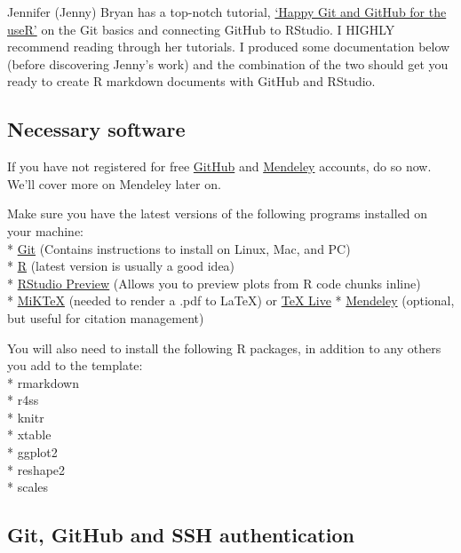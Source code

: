 \documentclass[12pt,]{article}
\begin{document}
Jennifer (Jenny) Bryan has a top-notch tutorial,
\href{http://happygitwithr.com/}{`Happy Git and GitHub for the useR'} on
the Git basics and connecting GitHub to RStudio. I HIGHLY recommend
reading through her tutorials. I produced some documentation below
(before discovering Jenny's work) and the combination of the two should
get you ready to create R markdown documents with GitHub and RStudio.

\subsection{Necessary software}\label{necessary-software}

If you have not registered for free \href{https://github.com}{GitHub}
and \href{www.mendeley.com}{Mendeley} accounts, do so now. We'll cover
more on Mendeley later on.

Make sure you have the latest versions of the following programs
installed on your machine:\\
 *
\href{https://git-scm.com/book/en/v2/Getting-Started-Installing-Git}{Git}
(Contains instructions to install on Linux, Mac, and PC)\\
 * \href{https://cran.r-project.org/bin/windows/base/}{R} (latest
version is usually a good idea)\\
 *
\href{https://www.rstudio.com/products/rstudio/download/preview/}{RStudio
Preview} (Allows you to preview plots from R code chunks inline)\\
 * \href{http://miktex.org/}{MiKTeX} (needed to render a .pdf to \LaTeX)
or \href{https://www.tug.org/texlive/}{TeX Live} *
\href{https://www.mendeley.com/}{Mendeley} (optional, but useful for
citation management)

You will also need to install the following R packages, in addition to
any others you add to the template:\\
 * rmarkdown\\
 * r4ss\\
 * knitr\\
 * xtable\\
 * ggplot2\\
 * reshape2\\
 * scales

\subsection{Git, GitHub and SSH
authentication}\label{git-github-and-ssh-authentication}
\end{document}
